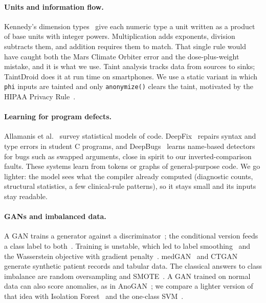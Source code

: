 \documentclass[12pt,a4paper]{article}
\newcommand{\code}[1]{\texttt{#1}}
\begin{document}
\paragraph{Units and information flow.} Kennedy's dimension types~\cite{kennedy1994} give each numeric type a unit
written as a product of base units with integer powers. Multiplication adds exponents, division subtracts them, and
addition requires them to match. That single rule would have caught both the Mars Climate Orbiter error and the
dose-plus-weight mistake, and it is what we use. Taint analysis tracks data from sources to sinks; TaintDroid
\cite{enck2010} does it at run time on smartphones. We use a static variant in which \code{phi} inputs are tainted and
only \code{anonymize()} clears the taint, motivated by the HIPAA Privacy Rule~\cite{hipaa}.

\paragraph{Learning for program defects.} Allamanis et al.~\cite{allamanis2018} survey statistical models of code.
DeepFix~\cite{gupta2017} repairs syntax and type errors in student C programs, and DeepBugs~\cite{pradel2018} learns
name-based detectors for bugs such as swapped arguments, close in spirit to our inverted-comparison faults. These
systems learn from tokens or graphs of general-purpose code. We go lighter: the model sees what the compiler already
computed (diagnostic counts, structural statistics, a few clinical-rule patterns), so it stays small and its inputs
stay readable.

\paragraph{GANs and imbalanced data.} A GAN trains a generator against a discriminator~\cite{goodfellow2014}; the
conditional version feeds a class label to both~\cite{mirza2014}. Training is unstable, which led to label
smoothing~\cite{salimans2016} and the Wasserstein objective with gradient penalty~\cite{arjovsky2017,gulrajani2017}.
medGAN~\cite{choi2017} and CTGAN~\cite{xu2019} generate synthetic patient records and tabular data. The classical
answers to class imbalance are random oversampling and SMOTE~\cite{chawla2002}. A GAN trained on normal data can also
score anomalies, as in AnoGAN~\cite{schlegl2017}; we compare a lighter version of that idea with Isolation
Forest~\cite{liu2008} and the one-class SVM~\cite{scholkopf2001}.
\end{document}

